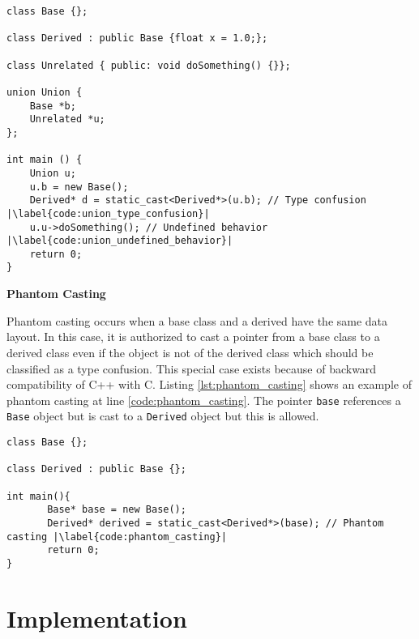 \documentclass[a4paper,11pt,oneside]{report}
\begin{document}
\begin{listing}
       \begin{verbatim}
class Base {};

class Derived : public Base {float x = 1.0;};

class Unrelated { public: void doSomething() {}};

union Union {
    Base *b;
    Unrelated *u;
};

int main () {
    Union u;
    u.b = new Base(); 
    Derived* d = static_cast<Derived*>(u.b); // Type confusion |\label{code:union_type_confusion}|
    u.u->doSomething(); // Undefined behavior |\label{code:union_undefined_behavior}|
    return 0;
}
       \end{verbatim}
       \caption{Union example}
       \label{lst:union}
\end{listing}

\textbf{Phantom Casting}

\noindent{}Phantom casting occurs when a base class and a derived have the same data layout.
In this case, it is authorized to cast a pointer from a base class to a derived class 
even if the object is not of the derived class which should be classified as a type confusion.
This special case exists because of backward compatibility of C++ with C. Listing \autoref{lst:phantom_casting} 
shows an example of phantom casting at line \ref{code:phantom_casting}. 
The pointer \texttt{base} references a \texttt{Base} object
but is cast to a \texttt{Derived} object but this is allowed.

\begin{listing}
       \begin{verbatim}
class Base {};

class Derived : public Base {};

int main(){
       Base* base = new Base();
       Derived* derived = static_cast<Derived*>(base); // Phantom casting |\label{code:phantom_casting}|
       return 0;
} 
       \end{verbatim}
       \caption{Phantom casting example}
       \label{lst:phantom_casting}

\end{listing}

\chapter{Implementation}
\end{document}
